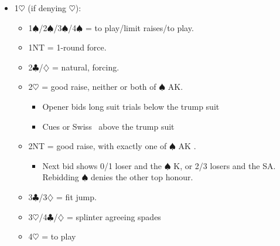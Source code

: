 \documentclass[a4paper,14pt]{extarticle}
\begin{document}
\begin{itemize}
\item 1$\heartsuit$ (if denying $\heartsuit$):
	\begin{itemize}
\label{note:4}
   \item 1$\spadesuit$/2$\spadesuit$/3$\spadesuit$/4$\spadesuit$ = to play/limit raises/to play.
\label{note:5}
   \item 1NT = 1-round force.
   \item 2$\clubsuit$/$\diamondsuit$ = natural, forcing.
   \item 2$\heartsuit$ = good raise, neither or both of $\spadesuit$ AK.
		\begin{itemize}
		\item Opener bids long suit trials below the trump suit
		\item Cues or Swiss~ above the trump suit
		\end{itemize}
   \item 2NT = good raise, with exactly one of $\spadesuit$ AK .
		\begin{itemize}
      \item Next bid shows 0/1 loser and the $\spadesuit$ K, or 2/3 losers and the SA.
         Rebidding $\spadesuit$ denies the other top honour.
		\end{itemize}
   \item 3$\clubsuit$/3$\diamondsuit$ = fit jump.
   \item 3$\heartsuit$/4$\clubsuit$/$\diamondsuit$ = splinter agreeing spades
	\item 4$\heartsuit$ = to play
	\end{itemize}

\newpage


\end{itemize}
\end{document}
